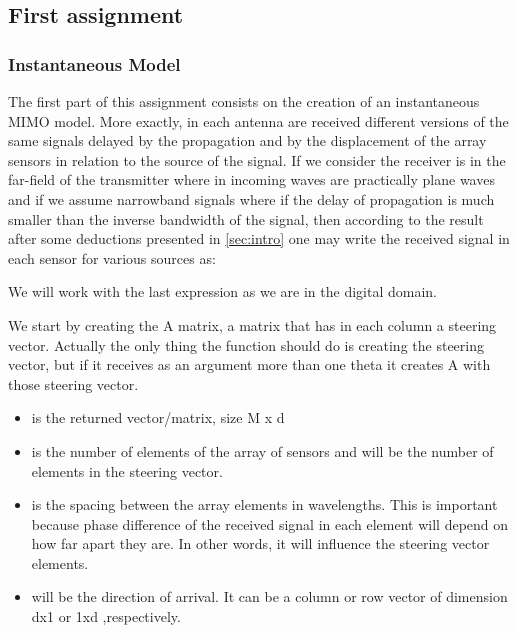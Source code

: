\documentclass[12pt, a4paper]{article}
\begin{document}
\subsection{First assignment}


\subsubsection{Instantaneous Model}


\par The first part of this assignment consists on the creation of an instantaneous MIMO model. More exactly, in each antenna are received different versions of the same signals delayed by the propagation and by the displacement of the array sensors in relation to the source of the signal. If we consider the receiver is in the far-field of the transmitter where in incoming waves are practically plane waves and if we assume narrowband signals where if the delay of propagation is much smaller than the inverse bandwidth of the signal, then according to the result after some deductions presented in \ref{sec:intro} one may write the received signal in each sensor for various sources as:


\par We will work with the last expression as we are in the digital domain.

\par We start by creating the A matrix, a matrix that has in each column a steering vector. Actually the only thing the function should do is creating the steering vector, but if it receives as an argument more than one theta it creates A with those steering vector. 

\begin{itemize}
    \item {} is the returned vector/matrix, size M x d
    \item {} is the number of elements of the array of sensors and will be the number of elements in the steering vector.
    \item {} is the spacing between the array elements in wavelengths. This is important because phase difference of the received signal in each element will depend on how far apart they are. In other words, it will influence the steering vector elements.
    \item {} will be the direction of arrival. It can be a column or row vector of dimension dx1 or 1xd ,respectively.
\end{itemize}
\end{document}

